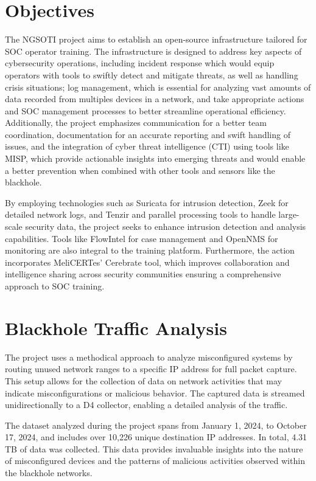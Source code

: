 \chapter{Objectives}
The NGSOTI project aims to establish an open-source infrastructure tailored for SOC operator training. The infrastructure is designed to address key aspects of cybersecurity operations, including incident response which would equip operators with tools to swiftly detect and mitigate threats, as well as handling crisis situations; log management, which is essential for analyzing vast amounts of data recorded from multiples devices in a network, and take appropriate actions and SOC management processes to better streamline operational efficiency. Additionally, the project emphasizes communication for a better team coordination, documentation for an accurate reporting and swift handling of issues, and the integration of cyber threat intelligence (CTI) using tools like MISP, which provide actionable insights into emerging threats and would enable a better prevention when combined with other tools and sensors like the blackhole.

By employing technologies such as Suricata for intrusion detection, Zeek for detailed network logs, and Tenzir and parallel processing tools to handle large-scale security data, the project seeks to enhance intrusion detection and analysis capabilities. Tools like FlowIntel for case management and OpenNMS for monitoring are also integral to the training platform. Furthermore, the action incorporates MeliCERTes' Cerebrate tool, which improves collaboration and intelligence sharing across security communities ensuring a comprehensive approach to SOC training.


\chapter{Blackhole Traffic Analysis}


The project uses a methodical approach to analyze misconfigured systems by routing unused network ranges to a specific IP address for full packet capture. This setup allows for the collection of data on network activities that may indicate misconfigurations or malicious behavior. The captured data is streamed unidirectionally to a D4 collector, enabling a detailed analysis of the traffic.

The dataset analyzed during the project spans from January 1, 2024, to October 17, 2024, and includes over 10,226 unique destination IP addresses. In total, 4.31 TB of data was collected. This data provides invaluable insights into the nature of misconfigured devices and the patterns of malicious activities observed within the blackhole networks.

